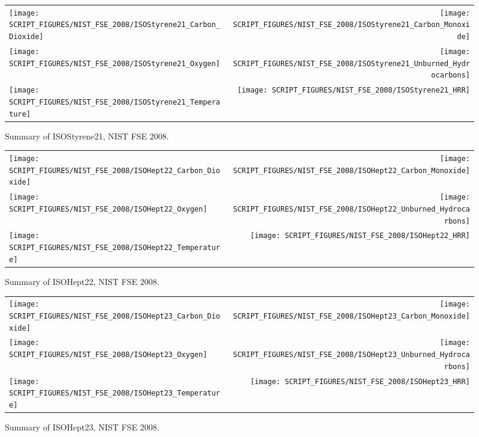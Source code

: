 \begin{figure}[h]
\begin{tabular*}{\textwidth}{l@{\extracolsep{\fill}}r}
\texttt{[image: SCRIPT\_FIGURES/NIST\_FSE\_2008/ISOStyrene21\_Carbon\_Dioxide]} &
\texttt{[image: SCRIPT\_FIGURES/NIST\_FSE\_2008/ISOStyrene21\_Carbon\_Monoxide]} \\
\texttt{[image: SCRIPT\_FIGURES/NIST\_FSE\_2008/ISOStyrene21\_Oxygen]} &
\texttt{[image: SCRIPT\_FIGURES/NIST\_FSE\_2008/ISOStyrene21\_Unburned\_Hydrocarbons]} \\
\texttt{[image: SCRIPT\_FIGURES/NIST\_FSE\_2008/ISOStyrene21\_Temperature]} &
\texttt{[image: SCRIPT\_FIGURES/NIST\_FSE\_2008/ISOStyrene21\_HRR]}
\end{tabular*}
\caption[Summary of ISOStyrene21, NIST FSE 2008]{Summary of ISOStyrene21, NIST FSE 2008.}
\label{NIST_FSE_1994_ISOStyrene21}
\end{figure}

\begin{figure}[h]
\begin{tabular*}{\textwidth}{l@{\extracolsep{\fill}}r}
\texttt{[image: SCRIPT\_FIGURES/NIST\_FSE\_2008/ISOHept22\_Carbon\_Dioxide]} &
\texttt{[image: SCRIPT\_FIGURES/NIST\_FSE\_2008/ISOHept22\_Carbon\_Monoxide]} \\
\texttt{[image: SCRIPT\_FIGURES/NIST\_FSE\_2008/ISOHept22\_Oxygen]} &
\texttt{[image: SCRIPT\_FIGURES/NIST\_FSE\_2008/ISOHept22\_Unburned\_Hydrocarbons]} \\
\texttt{[image: SCRIPT\_FIGURES/NIST\_FSE\_2008/ISOHept22\_Temperature]} &
\texttt{[image: SCRIPT\_FIGURES/NIST\_FSE\_2008/ISOHept22\_HRR]}
\end{tabular*}
\caption[Summary of ISOHept22, NIST FSE 2008]{Summary of ISOHept22, NIST FSE 2008.}
\label{NIST_FSE_1994_ISOHept22}
\end{figure}

\begin{figure}[h]
\begin{tabular*}{\textwidth}{l@{\extracolsep{\fill}}r}
\texttt{[image: SCRIPT\_FIGURES/NIST\_FSE\_2008/ISOHept23\_Carbon\_Dioxide]} &
\texttt{[image: SCRIPT\_FIGURES/NIST\_FSE\_2008/ISOHept23\_Carbon\_Monoxide]} \\
\texttt{[image: SCRIPT\_FIGURES/NIST\_FSE\_2008/ISOHept23\_Oxygen]} &
\texttt{[image: SCRIPT\_FIGURES/NIST\_FSE\_2008/ISOHept23\_Unburned\_Hydrocarbons]} \\
\texttt{[image: SCRIPT\_FIGURES/NIST\_FSE\_2008/ISOHept23\_Temperature]} &
\texttt{[image: SCRIPT\_FIGURES/NIST\_FSE\_2008/ISOHept23\_HRR]}
\end{tabular*}
\caption[Summary of ISOHept23, NIST FSE 2008]{Summary of ISOHept23, NIST FSE 2008.}
\label{NIST_FSE_1994_ISOHept23}
\end{figure}

